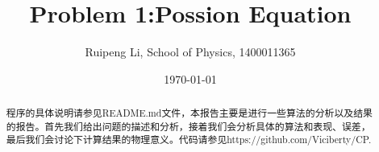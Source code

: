 \documentclass[letterpaper,12pt]{article}
\begin{document}
\title{Problem 1:Possion Equation}
\author{Ruipeng Li, School of Physics, 1400011365}
\date{\today}
\maketitle

\begin{abstract}	

程序的具体说明请参见README.md文件，本报告主要是进行一些算法的分析以及结果的报告。首先我们给出问题的描述和分析，接着我们会分析具体的算法和表现、误差，最后我们会讨论下计算结果的物理意义。代码请参见https://github.com/Viciberty/CP.

\end{abstract}
\end{document}
